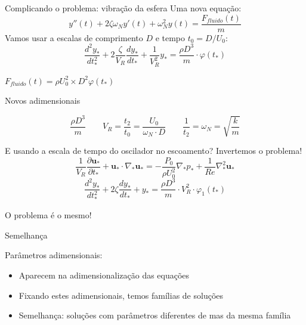 \documentclass{beamer}
\newcommand{\pr}[1]{\ensuremath{ \mathbf{#1}}}    %
\newcommand{\p}[1]{\ensuremath{ \mathbf{#1}}}    %
\newcommand{\pd}{\ensuremath{\partial}}
\begin{document}
\begin{frame}{Complicando o problema: vibração da esfera}
  Uma nova equação:
  \[
y''(t) + 2\zeta\omega_Ny'(t) + \omega_N^2y(t) = \frac{F_{fluido}(t)}{m}
\]
Vamos usar a escalas de comprimento $D$ e tempo $t_0 = D/U_0$:
\[
\frac{d^2y_*}{dt_*^2} + 2\frac{\zeta}{V_R} \frac{dy_*}{dt_*} + \frac{1}{V_R^2} y_* = \frac{\rho D^3}{m} \cdot \varphi\left(t_*\right)
\]

$F_{fluido}(t) = \rho U_0^2 \times D^2 \varphi(t_*)$

Novos adimensionais

\[
\frac{\rho D^3}{m}  \qquad V_R = \frac{t_2}{t_0} = \frac{U_0}{\omega_N \cdot D} \qquad \frac{1}{t_2} = \omega_N = \sqrt{\frac{k}{m}}
\]



\end{frame}


\begin{frame}{E usando a escala de tempo do oscilador no escoamento?}
  Invertemos o problema!
\[
\frac{1}{V_R}\frac{\pd\p{u}_*}{\pd t_*} + \p{u}_*\cdot\nabla_*\p{u_*} = -\frac{P_0}{\rho U_0^2}\nabla_* p_* + \frac{1}{Re}\nabla_*^2\p{u}_* 
\]
\[
\frac{d^2y_*}{dt_*^2} + 2\zeta\frac{dy_*}{dt_*} + y_* = \frac{\rho D^3}{m} \cdot V_R^2 \cdot \varphi_1\left(t_*\right)
\]

O problema é o mesmo!
\end{frame}


\begin{frame}{Semelhança}

  Parâmetros adimensionais:
  \begin{itemize}
  \item Aparecem na adimensionalização das equações
  \item Fixando estes adimensionais, temos famílias de soluções
  \item Semelhança: soluções com parâmetros diferentes de mas da mesma família
\end{itemize}
  
\end{frame}
\end{document}
